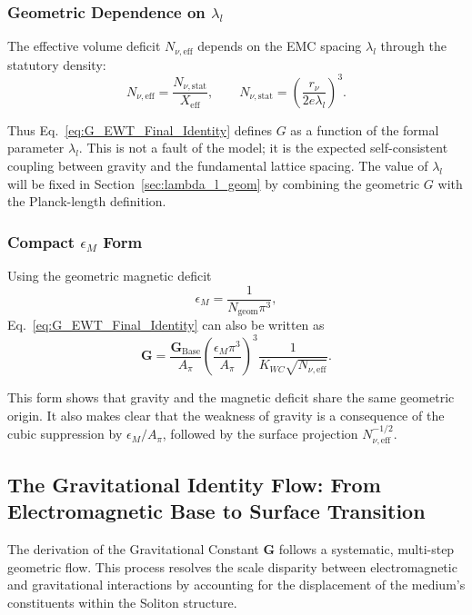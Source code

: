 \documentclass[10pt,a4paper]{article}
\begin{document}
\subsubsection*{Geometric Dependence on \(\lambda_l\)}

The effective volume deficit \(N_{\nu,\text{eff}}\) depends on the EMC spacing \(\lambda_l\) through the statutory density:
\begin{equation}
	N_{\nu,\text{eff}}
	=
	\frac{N_{\nu,\text{stat}}}{X_{\text{eff}}},
	\qquad
	N_{\nu,\text{stat}}
	=
	\left(
	\frac{r_\nu}{2 e \lambda_l}
	\right)^3 .
\end{equation}

Thus Eq.~\eqref{eq:G_EWT_Final_Identity} defines \(G\) as a function of the formal parameter \(\lambda_l\). This is not a fault of the model; it is the expected self-consistent coupling between gravity and the fundamental lattice spacing. The value of \(\lambda_l\) will be fixed in Section~\ref{sec:lambda_l_geom} by combining the geometric \(G\) with the Planck-length definition.

\subsubsection*{Compact \(\epsilon_M\) Form}

Using the geometric magnetic deficit
\begin{equation}
	\epsilon_M = \frac{1}{N_{\text{geom}}\pi^3},
\end{equation}
Eq.~\eqref{eq:G_EWT_Final_Identity} can also be written as
\begin{equation}
	\mathbf{G}
	=
	\frac{\mathbf{G}_{\text{Base}}}{A_\pi}
	\left(
	\frac{\epsilon_M \pi^3}{A_\pi}
	\right)^{3}
	\frac{1}{K_{WC} \sqrt{N_{\nu,\text{eff}}}} .
	\label{eq:G_final_epsilon_compact}
\end{equation}

This form shows that gravity and the magnetic deficit share the same geometric origin. It also makes clear that the weakness of gravity is a consequence of the cubic suppression by \(\epsilon_M/A_\pi\), followed by the surface projection \(N_{\nu,\text{eff}}^{-1/2}\).

\subsection{The Gravitational Identity Flow: From Electromagnetic Base to Surface Transition}

The derivation of the Gravitational Constant \(\mathbf{G}\) follows a systematic, multi-step geometric flow. This process resolves the scale disparity between electromagnetic and gravitational interactions by accounting for the displacement of the medium's constituents within the Soliton structure.
\end{document}
